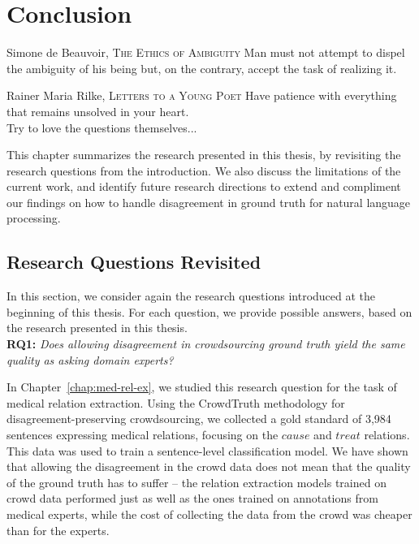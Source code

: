 %
\chapter{Conclusion}
\label{sec:conclusion}

\begin{chapquote}{Simone de Beauvoir, \textsc{The Ethics of Ambiguity}}
Man must not attempt to dispel the ambiguity of his being but, on the contrary, accept the task of realizing it.
\end{chapquote}

\begin{chapquote}{Rainer Maria Rilke, \textsc{Letters to a Young Poet}}
\noindent
Have patience with everything that remains unsolved in your heart. \\
Try to love the questions themselves...
\end{chapquote}

This chapter summarizes the research presented in this thesis, by revisiting the research questions from the introduction. We also discuss the limitations of the current work, and identify future research directions to extend and compliment our findings on how to handle disagreement in ground truth for natural language processing.

\section{Research Questions Revisited}

In this section, we consider again the research questions introduced at the beginning of this thesis. For each question, we provide possible answers, based on the research presented in this thesis. \\

\textbf{RQ1:} \textit{Does allowing disagreement in crowdsourcing ground truth yield the same quality as asking domain experts?}

In Chapter~\ref{chap:med-rel-ex}, we studied this research question for the task of medical relation extraction. Using the CrowdTruth methodology for disagreement-preserving crowdsourcing, we collected a gold standard of 3,984 sentences expressing medical relations, focusing on the $cause$ and $treat$ relations. This data was used to train a sentence-level classification model. We have shown that allowing the disagreement in the crowd data does not mean that the quality of the ground truth has to suffer -- the relation extraction models trained on crowd data performed just as well as the ones trained on annotations from medical experts, while the cost of collecting the data from the crowd was cheaper than for the experts.


